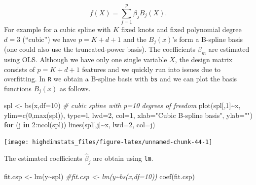 \documentclass[
]{book}
\newenvironment{Shaded}{\begin{snugshade}}{\end{snugshade}}
\newcommand{\AttributeTok}[1]{\textcolor[rgb]{0.77,0.63,0.00}{#1}}
\newcommand{\CommentTok}[1]{\textcolor[rgb]{0.56,0.35,0.01}{\textit{#1}}}
\newcommand{\ControlFlowTok}[1]{\textcolor[rgb]{0.13,0.29,0.53}{\textbf{#1}}}
\newcommand{\DecValTok}[1]{\textcolor[rgb]{0.00,0.00,0.81}{#1}}
\newcommand{\FunctionTok}[1]{\textcolor[rgb]{0.00,0.00,0.00}{#1}}
\newcommand{\NormalTok}[1]{#1}
\newcommand{\OtherTok}[1]{\textcolor[rgb]{0.56,0.35,0.01}{#1}}
\newcommand{\SpecialCharTok}[1]{\textcolor[rgb]{0.00,0.00,0.00}{#1}}
\newcommand{\StringTok}[1]{\textcolor[rgb]{0.31,0.60,0.02}{#1}}
\begin{document}
\[ f(X)=\sum_{j=1}^{p}\beta_j B_j(X).\]
For example for a cubic spline with \(K\) fixed knots and fixed polynomial degree \(d=3\) (``cubic'') we have \(p=K+d+1\) and the \(B_j(x)\)'s form a B-spline basis (one could also use the truncated-power basis). The coefficients \(\beta_m\) are estimated using OLS. Although we have only one single variable \(X\), the design matrix consists of \(p=K+d+1\) features and we quickly run into issues due to overfitting. In \texttt{R} we obtain a B-spline basis with \texttt{bs} and we can plot the basis functions \(B_j(x)\) as follows.

\begin{Shaded}
\begin{Highlighting}[]
\NormalTok{spl }\OtherTok{\textless{}{-}} \FunctionTok{bs}\NormalTok{(x,}\AttributeTok{df=}\DecValTok{10}\NormalTok{) }\CommentTok{\# cubic spline with p=10 degrees of freedom}
\FunctionTok{plot}\NormalTok{(spl[,}\DecValTok{1}\NormalTok{]}\SpecialCharTok{\textasciitilde{}}\NormalTok{x, }\AttributeTok{ylim=}\FunctionTok{c}\NormalTok{(}\DecValTok{0}\NormalTok{,}\FunctionTok{max}\NormalTok{(spl)), }\AttributeTok{type=}\StringTok{\textquotesingle{}l\textquotesingle{}}\NormalTok{, }\AttributeTok{lwd=}\DecValTok{2}\NormalTok{, }\AttributeTok{col=}\DecValTok{1}\NormalTok{, }
     \AttributeTok{xlab=}\StringTok{"Cubic B{-}spline basis"}\NormalTok{, }\AttributeTok{ylab=}\StringTok{""}\NormalTok{)}
\ControlFlowTok{for}\NormalTok{ (j }\ControlFlowTok{in} \DecValTok{2}\SpecialCharTok{:}\FunctionTok{ncol}\NormalTok{(spl)) }\FunctionTok{lines}\NormalTok{(spl[,j]}\SpecialCharTok{\textasciitilde{}}\NormalTok{x, }\AttributeTok{lwd=}\DecValTok{2}\NormalTok{, }\AttributeTok{col=}\NormalTok{j)}
\end{Highlighting}
\end{Shaded}

\begin{center}\texttt{[image: highdimstats\_files/figure-latex/unnamed-chunk-44-1]} \end{center}

The estimated coefficients \(\hat \beta_j\) are obtain using \texttt{lm}.

\begin{Shaded}
\begin{Highlighting}[]
\NormalTok{fit.csp }\OtherTok{\textless{}{-}} \FunctionTok{lm}\NormalTok{(y}\SpecialCharTok{\textasciitilde{}}\NormalTok{spl)}
\CommentTok{\#fit.csp \textless{}{-} lm(y\textasciitilde{}bs(x,df=10))}
\FunctionTok{coef}\NormalTok{(fit.csp)}
\end{Highlighting}
\end{Shaded}
\end{document}
